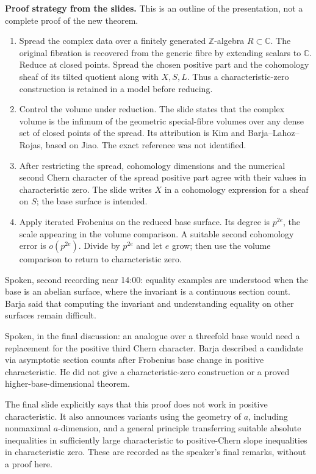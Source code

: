 \medskip\noindent
{\bf Proof strategy from the slides.}
This is an outline of the presentation,
not a complete proof of the new theorem.

\begin{enumerate}
\item Spread the complex data over a
finitely generated $\mathbb{Z}$-algebra
$R\subset\mathbb{C}$. The original
fibration is recovered from the generic
fibre by extending scalars to
$\mathbb{C}$. Reduce at closed points.
Spread the chosen
positive part and the cohomology sheaf of
its tilted quotient along with $X,S,L$.
Thus a characteristic-zero construction
is retained in a model before reducing.
\item Control the volume under reduction.
The slide states that the complex volume
is the infimum of the geometric
special-fibre volumes over any dense set
of closed points of the spread.
Its attribution is Kim and
Barja--Lahoz--Rojas, based on Jiao.
The exact reference was not identified.
\item After restricting the spread,
cohomology dimensions and the numerical
second Chern character of the spread
positive part agree with their values
in characteristic zero.
The slide writes $X$ in a cohomology
expression for a sheaf on $S$; the base
surface is intended.
\item Apply iterated Frobenius on the
reduced base surface. Its degree is
$p^{2e}$, the scale appearing in the
volume comparison. A suitable second
cohomology error is
$o(p^{2e})$. Divide by $p^{2e}$ and let
$e$ grow; then use the volume comparison
to return to characteristic zero.
\end{enumerate}

Spoken, second recording near 14:00:
equality examples are understood when the
base is an abelian surface, where the
invariant is a continuous section count.
Barja said that computing the invariant
and understanding equality on other
surfaces remain difficult.

Spoken, in the final discussion: an
analogue over a threefold base would need
a replacement for the positive third
Chern character. Barja described a
candidate via asymptotic section counts
after Frobenius base change in positive
characteristic. He did not give a
characteristic-zero construction or a
proved higher-base-dimensional theorem.

The final slide explicitly says that this
proof does not work in positive
characteristic. It also announces variants
using the geometry of $a$, including
nonmaximal $a$-dimension, and a general
principle transferring suitable absolute
inequalities in sufficiently large
characteristic to positive-Chern slope
inequalities in characteristic zero.
These are recorded as the speaker's final
remarks, without a proof here.

